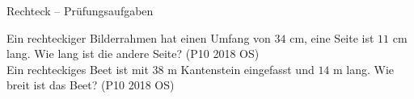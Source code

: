 \setcounter{aufgabe}{0}

\begin{aufgabe}{Rechteck – Prüfungsaufgaben}
\begin{teile}
\teil Ein rechteckiger Bilderrahmen hat einen Umfang von $34$ cm, eine Seite ist $11$ cm lang. Wie lang ist die andere Seite? \hfill (P10 2018 OS) \\ \leerfeld[cm]
\teil Ein rechteckiges Beet ist mit $38$ m Kantenstein eingefasst und $14$ m lang. Wie breit ist das Beet? \hfill (P10 2018 OS) \\ \leerfeld[m]
\end{teile}
\end{aufgabe}
